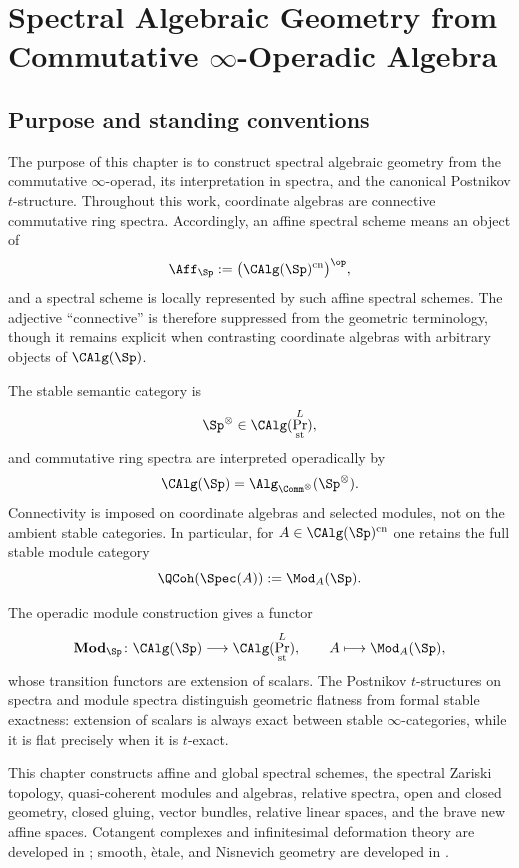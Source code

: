 \chapter{Spectral Algebraic Geometry from Commutative
\texorpdfstring{$\infty$}{infinity}-Operadic Algebra}
\label{chap:spectral-algebraic-geometry}
\label{chap:connective-spectral-algebraic-geometry}

\section{Purpose and standing conventions}
\label{sec:spectral-ag-purpose}

The purpose of this chapter is to construct spectral algebraic geometry
from the commutative $\infty$-operad, its interpretation in spectra, and
the canonical Postnikov $t$-structure. Throughout this work, coordinate
algebras are connective commutative ring spectra. Accordingly, an affine
spectral scheme means an object of
\[
    \Aff_{\Sp}
    :=
    \bigl(\CAlg(\Sp)^{\mathrm{cn}}\bigr)^{\op},
\]
and a spectral scheme is locally represented by such affine spectral
schemes. The adjective ``connective'' is therefore suppressed from the
geometric terminology, though it remains explicit when contrasting
coordinate algebras with arbitrary objects of $\CAlg(\Sp)$.

The stable semantic category is
\[
    \Sp^\otimes
    \in
    \CAlg(\Pr^L_{\mathrm{st}}),
\]
and commutative ring spectra are interpreted operadically by
\[
    \CAlg(\Sp)
    =
    \Alg_{\Comm^\otimes}(\Sp^\otimes).
\]
Connectivity is imposed on coordinate algebras and selected modules, not
on the ambient stable categories. In particular, for
$A\in\CAlg(\Sp)^{\mathrm{cn}}$ one retains the full stable module category
\[
    \QCoh(\Spec(A))
    :=
    \Mod_A(\Sp).
\]

The operadic module construction gives a functor
\[
    \mathbf{Mod}_{\Sp}
    \colon
    \CAlg(\Sp)
    \longrightarrow
    \CAlg(\Pr^L_{\mathrm{st}}),
    \qquad
    A
    \longmapsto
    \Mod_A(\Sp),
\]
whose transition functors are extension of scalars. The Postnikov
$t$-structures on spectra and module spectra distinguish geometric
flatness from formal stable exactness: extension of scalars is always
exact between stable $\infty$-categories, while it is flat precisely when
it is $t$-exact.

This chapter constructs affine and global spectral schemes, the spectral
Zariski topology, quasi-coherent modules and algebras, relative spectra,
open and closed geometry, closed gluing, vector bundles, relative linear
spaces, and the brave new affine spaces. Cotangent complexes and
infinitesimal deformation theory are developed in
; smooth, \`etale, and Nisnevich
geometry are developed in .

